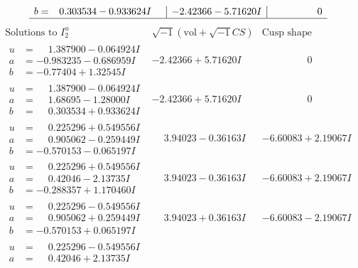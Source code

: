 \documentclass[1p]{elsarticle_modified}
\theoremstyle{definition}
\newcommand{\I}{\sqrt{-1}}
\begin{document}
$$\begin{array}{c|c|c}
\begin{aligned}
b &= \phantom{-}0.303534 - 0.933624 I\end{aligned}
 & -2.42366 - 5.71620 I & \phantom{-0.000000 } 0\\
 \hline 
 \end{array}$$\newpage$$\begin{array}{c|c|c}  
\text{Solutions to }I^u_{2}& \I (\text{vol} + \sqrt{-1}CS) & \text{Cusp shape}\\
 \hline 
\begin{aligned}
u &= \phantom{-}1.387900 - 0.064924 I \\
a &= -0.983235 - 0.686959 I \\
b &= -0.77404 + 1.32545 I\end{aligned}
 & -2.42366 + 5.71620 I & \phantom{-0.000000 } 0 \\ \hline\begin{aligned}
u &= \phantom{-}1.387900 - 0.064924 I \\
a &= \phantom{-}1.68695 - 1.28000 I \\
b &= \phantom{-}0.303534 + 0.933624 I\end{aligned}
 & -2.42366 + 5.71620 I & \phantom{-0.000000 } 0 \\ \hline\begin{aligned}
u &= \phantom{-}0.225296 + 0.549556 I \\
a &= \phantom{-}0.905062 - 0.259449 I \\
b &= -0.570153 - 0.065197 I\end{aligned}
 & \phantom{-}3.94023 - 0.36163 I & -6.60083 + 2.19067 I \\ \hline\begin{aligned}
u &= \phantom{-}0.225296 + 0.549556 I \\
a &= \phantom{-}0.42046 - 2.13735 I \\
b &= -0.288357 + 1.170460 I\end{aligned}
 & \phantom{-}3.94023 - 0.36163 I & -6.60083 + 2.19067 I \\ \hline\begin{aligned}
u &= \phantom{-}0.225296 - 0.549556 I \\
a &= \phantom{-}0.905062 + 0.259449 I \\
b &= -0.570153 + 0.065197 I\end{aligned}
 & \phantom{-}3.94023 + 0.36163 I & -6.60083 - 2.19067 I \\ \hline\begin{aligned}
u &= \phantom{-}0.225296 - 0.549556 I \\
a &= \phantom{-}0.42046 + 2.13735 I \\

\end{aligned}
\end{array}$$
\end{document}
